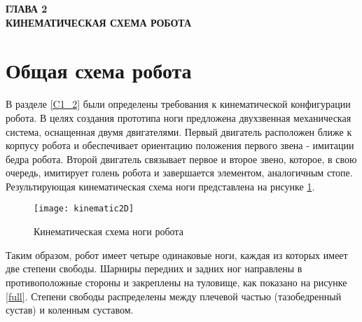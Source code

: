 
\newpage

\begin{center}
	\textbf{\large ГЛАВА 2 \\ КИНЕМАТИЧЕСКАЯ СХЕМА РОБОТА}
\end{center}


\section{Общая схема робота}\label{C2_1}

В разделе \ref{C1_2} были определены требования к кинематической конфигурации робота. В целях создания прототипа ноги предложена двухзвенная механическая система, оснащенная двумя двигателями. Первый двигатель расположен ближе к корпусу робота и обеспечивает ориентацию положения первого звена - имитации бедра робота. Второй двигатель связывает первое и второе звено, которое, в свою очередь, имитирует голень робота и завершается элементом, аналогичным стопе. Результирующая кинематическая схема ноги представлена на рисунке \ref{kinematic2D}.

\begin{figure}[ht]
	\begin{center}
		\texttt{[image: kinematic2D]}
		\caption{Кинематическая схема ноги робота}
		\label{kinematic2D}
	\end{center}
\end{figure}

Таким образом, робот имеет четыре одинаковые ноги, каждая из которых имеет две степени свободы. Шарниры передних и задних ног направлены в противоположные стороны и закреплены на туловище, как показано на рисунке \ref{full}. Степени свободы распределены между плечевой частью (тазобедренный сустав) и коленным суставом.

